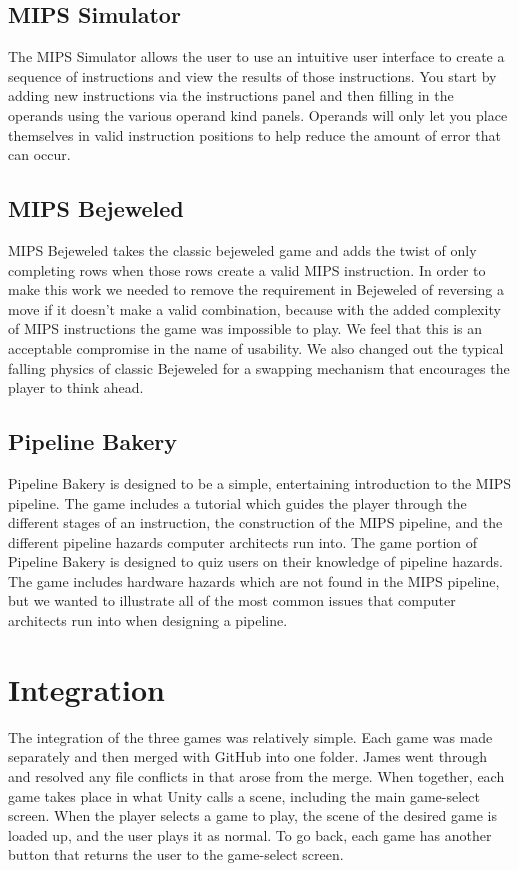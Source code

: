 \documentclass[12pt]{article}
\begin{document}
	\subsection{MIPS Simulator}
	The MIPS Simulator allows the user to use an intuitive user interface to create a sequence of instructions and view the results of those instructions. You start by adding new instructions via the instructions panel and then filling in the operands using the various operand kind panels. Operands will only let you place themselves in valid instruction positions to help reduce the amount of error that can occur.
	\subsection{MIPS Bejeweled}
	MIPS Bejeweled takes the classic bejeweled game and adds the twist of only completing rows when those rows create a valid MIPS instruction. In order to make this work we needed to remove the requirement in Bejeweled of reversing a move if it doesn't make a valid combination, because with the added complexity of MIPS instructions the game was impossible to play. We feel that this is an acceptable compromise in the name of usability. We also changed out the typical falling physics of classic Bejeweled for a swapping mechanism that encourages the player to think ahead.
	\subsection{Pipeline Bakery}
	Pipeline Bakery is designed to be a simple, entertaining introduction to the MIPS pipeline. The game includes a tutorial which guides the player through the different stages of an instruction, the construction of the MIPS pipeline, and the different pipeline hazards computer architects run into. The game portion of Pipeline Bakery is designed to quiz users on their knowledge of pipeline hazards. The game includes hardware hazards which are not found in the MIPS pipeline, but we wanted to illustrate all of the most common issues that computer architects run into when designing a pipeline. 
	\section{Integration}
	The integration of the three games was relatively simple. Each game was made separately and then merged with GitHub into one folder. James went through and resolved any file conflicts in that arose from the merge. When together, each game takes place in what Unity calls a scene, including the main game-select screen. When the player selects a game to play, the scene of the desired game is loaded up, and the user plays it as normal. To go back, each game has another button that returns the user to the game-select screen.
\end{document}
